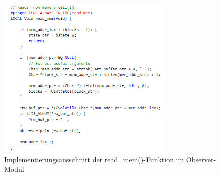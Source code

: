 \begin{figure}[h!]
	\centering
	\includegraphics[width=0.75\textwidth]{../Bilder/ObserverModule/read_mem.png}
	\caption{Implementierungsausschnitt der read\_mem()-Funktion im Observer-Modul}
	\label{fig:read_mem_function}
\end{figure}

